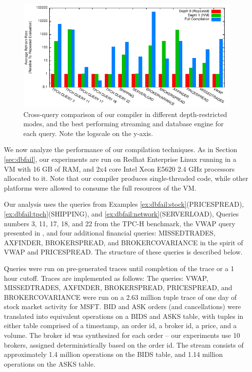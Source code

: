 
\begin{figure}
\begin{center}
\includegraphics[width=\textwidth]{../graphs/graphs/bakeoff.pdf}
\caption{Cross-query comparison of our compiler in different depth-restricted modes, and the best performing streaming and database engine for each query.  Note the logscale on the y-axis.}
\label{fig:experiments:bakeoff}
\end{center}
\end{figure}

We now analyze the performance of our compilation techniques.  As in Section \ref{sec:dbfail}, our experiments are run on Redhat Enterprise Linux running in a VM with 16 GB of RAM, and 2x4 core Intel Xeon E5620 2.4 GHz processors allocated to it.  Note that our compiler produces single-threaded code, while other platforms were allowed to consume the full resources of the VM.
 
Our analysis uses the queries from Examples \ref{ex:dbfail:stock}(PRICESPREAD),  \ref{ex:dbfail:tpch}(SHIPPING), and \ref{ex:dbfail:network}(SERVERLOAD), Queries numbers 3, 11, 17, 18, and 22 from the TPC-H\cite{tpch} benchmark, the VWAP query presented in \cite{kennedy-ahmad-koch-cidr:11}, and four additional financial queries: MISSEDTRADES, AXFINDER, BROKERSPREAD, and BROKERCOVARIANCE in the spirit of VWAP and PRICESPREAD.  The structure of these queries is described below.

Queries were run on pre-generated traces until completion of the trace or a 1 hour cutoff.  Traces are implemented as follows: The queries: VWAP, MISSEDTRADES, AXFINDER, BROKERSPREAD, PRICESPREAD, and BROKERCOVARIANCE were run on a 2.63 million tuple trace of one day of stock market activity for MSFT.  BID and ASK orders (and cancellations) were translated into equivalent operations on a BIDS and ASKS table, with tuples in either table comprised of a timestamp, an order id, a broker id, a price, and a volume.  The broker id was synthesized for each order -- our experiments use 10 brokers, assigned deterministically based on the order id.  The stream consists of approximately 1.4 million operations on the BIDS table, and 1.14 million operations on the ASKS table.

